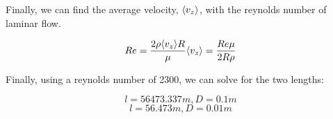 \documentclass{article}
\begin{document}
Finally, we can find the average velocity, $\langle v_z \rangle$, with the reynolds number of laminar flow. 

\begin{equation}
    Re = \frac{2\rho \langle v_z \rangle R}{\mu}
    \langle v_z \rangle = \frac{Re \mu}{2R\rho}
\end{equation}

Finally, using a reynolds number of 2300, we can solve for the two lengths:

\begin{equation}
    \boxed{l = 56473.337 m, D = 0.1 m}
\end{equation}
\begin{equation}
    \boxed{l = 56.473 m, D = 0.01 m}
\end{equation}
\end{document}

